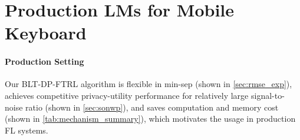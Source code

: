 

\section{Production LMs for Mobile Keyboard} \label{sec:gboard}



\paragraph{Production Setting} Our BLT-DP-FTRL algorithm is flexible in min-sep (shown in \cref{sec:rmse_exp}), achieves competitive privacy-utility performance for relatively large signal-to-noise ratio (shown in \cref{sec:sonwp}), and saves computation and memory cost (shown in \cref{tab:mechanism_summary}), which motivates the usage in production FL systems. 



